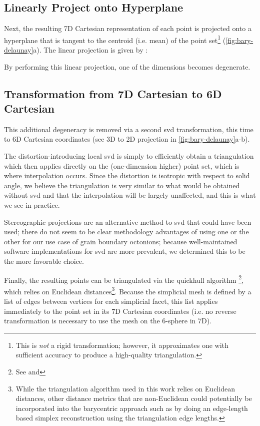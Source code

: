 \documentclass[final,12pt]{elsarticle}
\begin{document}
\subsection{Linearly Project onto Hyperplane}
\label{sec:app:bary:tri:project}
Next, the resulting 7D Cartesian representation of each point is projected onto a hyperplane that is tangent to the centroid (i.e. mean) of the point set\footnote{This is \textit{not} a rigid transformation; however, it approximates one with sufficient accuracy to produce a high-quality triangulation.} (\cref{fig:bary-delaunay}a). The linear projection is given by \cite{anatoliyCheckIfRay2015}:

By performing this linear projection, one of the dimensions becomes degenerate.

\subsection{ Transformation from 7D Cartesian to 6D Cartesian}
\label{sec:app:bary:tri:svd2}
This additional degeneracy is removed via a second \gls{svd} transformation, this time to 6D Cartesian coordinates (see 3D to 2D projection in \cref{fig:bary-delaunay}a-b). 

The distortion-introducing local \gls{svd} is simply to efficiently obtain a triangulation which then applies directly on the (one-dimension higher) point set, which is where interpolation occurs. Since the distortion is isotropic with respect to solid angle, we believe the triangulation is very similar to what would be obtained without \gls{svd} and that the interpolation will be largely unaffected, and this is what we see in practice.

Stereographic projections are an alternative method to \gls{svd} that could have been used; there do not seem to be clear methodology advantages of using one or the other for our use case of grain boundary octonions; because well-maintained software implementations for \gls{svd} are more prevalent, we determined this to be the more favorable choice.

Finally, the resulting points can be triangulated via the quickhull algorithm \cite{barberQuickhullAlgorithmConvex1996}\footnote{See  and }, which relies on Euclidean distances\footnote{While the triangulation algorithm used in this work relies on Euclidean distances, other distance metrics that are non-Euclidean \cite{morawiecDistancesGrainInterfaces2019} could potentially be incorporated into the barycentric approach such as by doing an edge-length based simplex reconstruction \cite{connorHighdimensionalSimplexesSupermetric2017,boissonnatOnlyDistancesAre2017} using the triangulation edge lengths.}. Because the simplicial mesh is defined by a list of edges between vertices for each simplicial facet, this list applies immediately to the point set in its 7D Cartesian coordinates (i.e. no reverse transformation is necessary to use the mesh on the 6-sphere in 7D).
\end{document}
